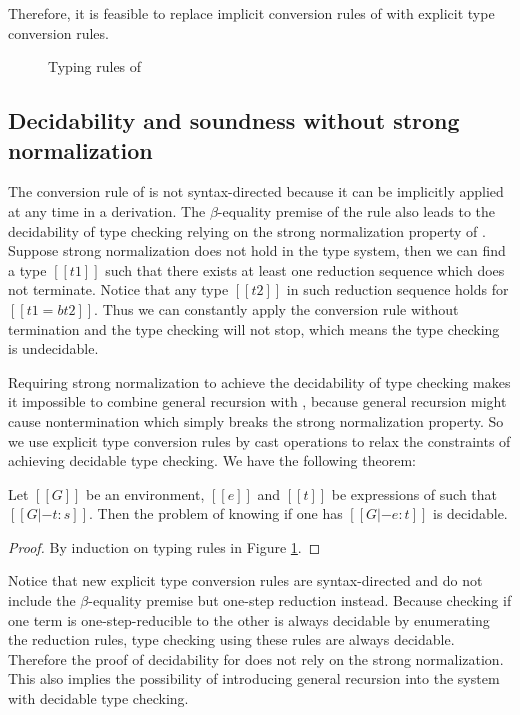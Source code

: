 Therefore, it is feasible to replace implicit conversion rules of \cc with explicit type conversion rules.

\begin{figure}[ht]
	\ottdefnexprcoc{}
	\caption{Typing rules of \cc}
	\label{fig:ecc:typerule}
\end{figure}

\subsection{Decidability and soundness without strong normalization}\label{sec:ecc:sound}
The conversion rule of \cc is not syntax-directed because it can be implicitly applied at any time in a derivation. The $\beta$-equality premise of the rule also leads to the decidability of type checking relying on the strong normalization property of \cc. Suppose strong normalization does not hold in the type system, then we can find a type $[[t1]]$ such that there exists at least one reduction sequence which does not terminate. Notice that any type $[[t2]]$ in such reduction sequence holds for $[[t1 =b t2]]$. Thus we can constantly apply the conversion rule without termination and the type checking will not stop, which means the type checking is undecidable.

Requiring strong normalization to achieve the decidability of type checking makes it impossible to combine general recursion with \cc, because general recursion might cause nontermination which simply breaks the strong normalization property. So we use explicit type conversion rules by cast operations to relax the constraints of achieving decidable type checking. We have the following theorem:

\begin{thm}
Let $[[G]]$ be an environment, $[[e]]$ and $[[t]]$ be expressions of \expcc such that $[[G |- t : s]]$. Then the problem of knowing if one has $[[G |- e : t]]$ is decidable.
\end{thm}

\begin{proof}
By induction on typing rules in Figure \ref{fig:ecc:typerule}.
\end{proof}

Notice that new explicit type conversion rules are syntax-directed and do not include the $\beta$-equality premise but one-step reduction instead. Because checking if one term is one-step-reducible to the other is always decidable by enumerating the reduction rules, type checking using these rules are always decidable. Therefore the proof of decidability for \expcc does not rely on the strong normalization. This also implies the possibility of introducing general recursion into the system with decidable type checking.

